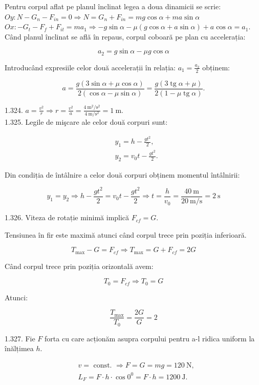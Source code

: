\documentclass[10pt]{article}
\begin{document}
Pentru corpul aflat pe planul înclinat legea a doua dinamicii se scrie:\\
$O y: N-G_{n}-F_{i n}=0 \Rightarrow N=G_{n}+F_{i n}=m g \cos \alpha+m a \sin \alpha$\\
$O x:-G_{t}-F_{f}+F_{i t}=m a_{1} \Rightarrow-g \sin \alpha-\mu(g \cos \alpha+a \sin \alpha)+a \cos \alpha=a_{1}$.\\
Când planul înclinat se află în repaus, corpul coboară pe plan cu accelerația:

$$
a_{2}=g \sin \alpha-\mu g \cos \alpha
$$

Introducând expresiile celor două accelerații în relația: $a_{1}=\frac{a_{2}}{2}$ obținem:

$$
a=\frac{g(3 \sin \alpha+\mu \cos \alpha)}{2(\cos \alpha-\mu \sin \alpha)}=\frac{g(3 \operatorname{tg} \alpha+\mu)}{2(1-\mu \operatorname{tg} \alpha)} .
$$

1.324. $a=\frac{v^{2}}{r} \Rightarrow r=\frac{v^{2}}{a}=\frac{4 \mathrm{~m}^{2} / \mathrm{s}^{2}}{4 \mathrm{~m} / \mathrm{s}^{2}}=1 \mathrm{~m}$.\\
1.325. Legile de mişcare ale celor două corpuri sunt:

$$
\begin{aligned}
& y_{1}=h-\frac{g t^{2}}{2}, \\
& y_{2}=v_{0} t-\frac{g t^{2}}{2} .
\end{aligned}
$$

Din condiția de întâlnire a celor două corpuri obținem momentul întâlnirii:

$$
y_{1}=y_{2} \Rightarrow h-\frac{g t^{2}}{2}=v_{0} t-\frac{g t^{2}}{2} \Rightarrow t=\frac{h}{v_{0}}=\frac{40 \mathrm{~m}}{20 \mathrm{~m} / \mathrm{s}}=2 \mathrm{~s}
$$

1.326. Viteza de rotație minimă implică $F_{c f}=G$.

Tensiunea în fir este maximă atunci când corpul trece prin poziția inferioară.

$$
T_{\max }-G=F_{c f} \Rightarrow T_{\max }=G+F_{c f}=2 G
$$

Când corpul trece prin poziția orizontală avem:

$$
T_{0}=F_{c f} \Rightarrow T_{0}=G
$$

Atunci:

$$
\frac{T_{\max }}{T_{0}}=\frac{2 G}{G}=2
$$

1.327. Fie $F$ forta cu care acționăm asupra corpului pentru a-l ridica uniform la înălțimea $h$.

$$
\begin{aligned}
& v=\text { const. } \Rightarrow F=G=m g=120 \mathrm{~N}, \\
& L_{F}=F \cdot h \cdot \cos 0^{0}=F \cdot h=1200 \mathrm{~J} .
\end{aligned}
$$
\end{document}
